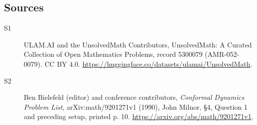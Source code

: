 \documentclass[11pt]{article}
\begin{document}
\subsection{Sources}
\begin{description}
\item[\hypertarget{source:5300079:1}{S1}] ULAM.AI and the UnsolvedMath Contributors, UnsolvedMath: A Curated Collection of Open Mathematics Problems, record 5300079 (AMR-052-0079). CC BY 4.0. \url{https://huggingface.co/datasets/ulamai/UnsolvedMath}.
\item[\hypertarget{source:5300079:2}{S2}] Ben Bielefeld (editor) and conference contributors, \emph{Conformal Dynamics Problem List}, arXiv:math/9201271v1 (1990), John Milnor, \S4, Question 1 and preceding setup, printed p. 10. \url{https://arxiv.org/abs/math/9201271v1}.
\end{description}
\label{end:5300079}
\end{document}
